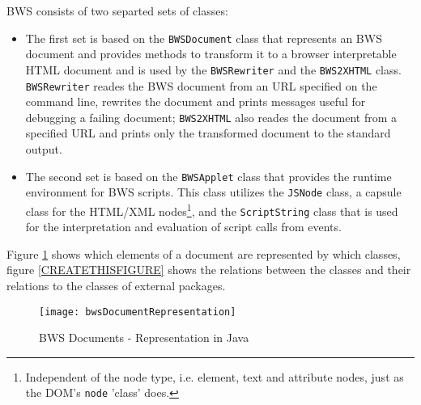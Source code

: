 BWS consists of two separted sets of classes: 

\begin{itemize}

\item The first set is based on the \texttt{BWSDocument} class that represents an BWS document and provides methods to transform it to a browser   interpretable HTML document and is used by the \texttt{BWSRewriter} and the \texttt{BWS2XHTML} class.
 \texttt{BWSRewriter} reades the BWS document from an URL specified on the command line, rewrites the document and
 prints messages useful for debugging a failing document; \texttt{BWS2XHTML} also reades the document from a specified
 URL and prints only the transformed document to the standard output.

\item The second set is based on the \texttt{BWSApplet} class that provides the runtime environment for BWS scripts. This class utilizes the \texttt{JSNode} class, a capsule class for the HTML/XML nodes\footnote{Independent of the node type, i.e. element, text and attribute nodes, just as the DOM's \texttt{node} 'class' does.}, and the \texttt{ScriptString} class that is used for the interpretation and evaluation of script calls from events.

\end{itemize}

Figure \ref{fig:bwsDocumentRepresentation} shows which elements of a document are represented by which classes, figure \ref{CREATETHISFIGURE} shows the relations between the classes and their relations to the classes of external packages.

\begin{figure}
	\centering
		\texttt{[image: bwsDocumentRepresentation]}
	\caption{BWS Documents - Representation in Java}
	\label{fig:bwsDocumentRepresentation}
\end{figure}
